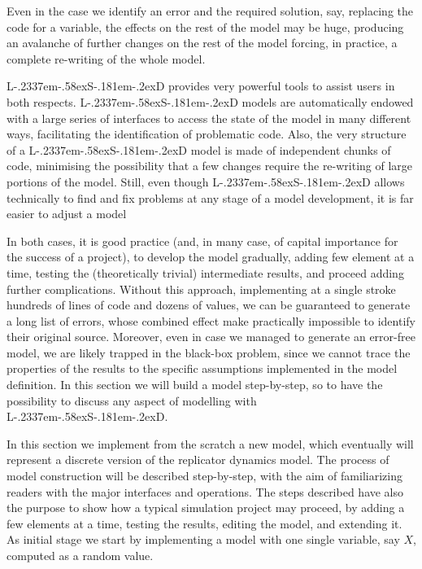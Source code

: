 \documentclass [11pt,a4paper] {book}
\def\LsD{{L\kern-.2337em\lower-.58ex\hbox{S}\kern-.181em\lower-.2ex\hbox{D}}\xspace}
\begin{document}
Even in the case we identify an error and the required solution, say, replacing the code for a variable, the effects on the rest of the model may be huge, producing an avalanche of further changes on the rest of the model forcing, in practice, a complete re-writing of the whole model.

\LsD provides very powerful tools to assist users in both respects. \LsD models are automatically endowed with a large series of interfaces to access the state of the model in many different ways, facilitating the identification of problematic code. Also, the very structure of a \LsD model is made of independent chunks of code, minimising the possibility that a few changes require the re-writing of large portions of the model. Still, even though \LsD allows technically to find and fix problems at any stage of a model development, it is far easier to adjust a model

In both cases, it is good practice (and, in many case, of capital importance for the success of a project), to develop the model gradually, adding few element at a time, testing the (theoretically trivial) intermediate results, and proceed adding further complications. Without this approach, implementing at a single stroke hundreds of lines of code and dozens of values, we can be guaranteed to generate a long list of errors, whose combined effect make practically impossible to identify their original source. Moreover, even in case we managed to generate an error-free model, we are likely trapped in the black-box problem, since we cannot trace the properties of the results to the specific assumptions implemented in the model definition. In this section we will build a model step-by-step, so to have the possibility to discuss any aspect of modelling with \LsD. 

In this section we implement from the scratch a new model, which eventually will represent a discrete version of the replicator dynamics model. The process of model construction will be described step-by-step, with the aim of familiarizing readers with the major interfaces and operations. The steps described have also the purpose to show how a typical simulation project may proceed, by adding a few elements at a time, testing the results, editing the model, and extending it. As initial stage we start by implementing a model with one single variable, say $X$, computed as a random value.
\end{document}
